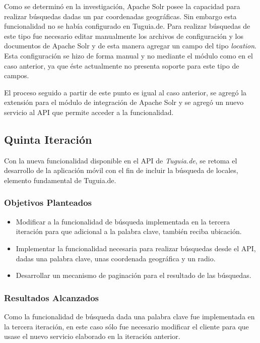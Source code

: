 Como se determinó en la investigación, Apache Solr posee la capacidad para realizar búsquedas dadas un par coordenadas geográficas. Sin embargo esta funcionalidad no se había configurado en Tuguia.de. Para realizar búsquedas de este tipo fue necesario editar manualmente los archivos de configuración y los documentos de Apache Solr y de esta manera agregar un campo del tipo \textit{location}. Esta configuración se hizo de forma manual y no mediante el módulo como en el caso anterior, ya que éste actualmente no presenta soporte para este tipo de campos. 

El proceso seguido a partir de este punto es igual al caso anterior, se agregó la extensión para el módulo de integración de Apache Solr y se agregó un nuevo servicio al API que permite acceder a la funcionalidad.

\subsection{Quinta Iteración}

Con la nueva funcionalidad disponible en el API de \textit{Tuguia.de}, se retoma el desarrollo de la aplicación móvil con el fin de incluir la búsqueda de locales, elemento fundamental de Tuguia.de.
 
\subsubsection{Objetivos Planteados} 
\begin{itemize}
\item Modificar a la funcionalidad de búsqueda implementada en la tercera iteración para que adicional a la palabra clave, también reciba ubicación.
\item Implementar la funcionalidad necesaria para realizar búsquedas desde el API, dadas una palabra clave, unas coordenada geográfica y un radio.
\item Desarrollar un mecanismo de paginación para el resultado de las búsquedas.
\end{itemize}

\subsubsection{Resultados Alcanzados}

Como la funcionalidad de búsqueda dada una palabra clave fue implementada en la tercera iteración, en este caso sólo fue necesario modificar el cliente para que usase el nuevo servicio elaborado en la iteración anterior.

